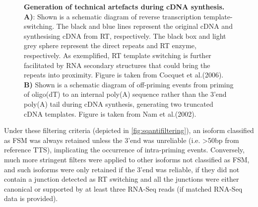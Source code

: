 \begin{figure}[h]
	{\textbf{Generation of technical artefacts during cDNA synthesis. A)}: Shown is a schematic diagram of reverse transcription template-switching. The black and blue lines represent the original cDNA and synthesising cDNA from RT, respectively. The black box and light grey sphere represent the direct repeats and RT enzyme, respectively. As exemplified, RT template switching is further facilitated by RNA secondary structures that could bring the repeats into proximity\cite{Cocquet2006}. Figure is taken from Cocquet et al.(2006)\cite{Cocquet2006}. \textbf{B)} Shown is a schematic diagram of off-priming events from priming of oligo(dT) to an internal poly(A) sequence rather than the 3'end poly(A) tail during cDNA synthesis, generating two truncated cDNA templates. Figure is taken from Nam et al.(2002)\cite{Nam2002}. }
	\label{fig:lib_prep_artifacts}
\end{figure}

Under these filtering criteria (depicted in \cref{fig:sqantifiltering}), an isoform classified as FSM was always retained unless the 3'end was unreliable (i.e. >50bp from reference TTS), implicating the occurrence of intra-priming events. Conversely, much more stringent filters were applied to other isoforms not classified as FSM, and such isoforms were only retained if the 3'end was reliable, if they did not contain a junction detected as RT switching and all the junctions were either canonical or supported by at least three RNA-Seq reads (if matched RNA-Seq data is provided).   

